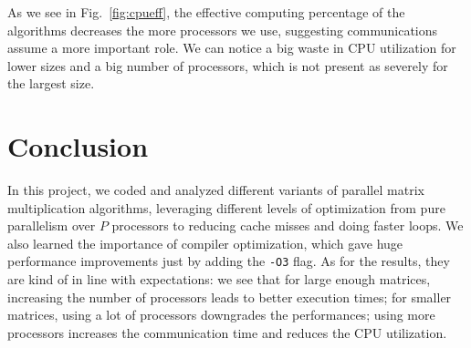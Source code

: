 \documentclass[11pt]{article}
\begin{document}
As we see in Fig.~\ref{fig:cpueff}, the effective computing percentage of the algorithms decreases the more processors we use, suggesting communications assume a more important role. We can notice a big waste in CPU utilization for lower sizes and a big number of processors, which is not present as severely for the largest size.

\section{Conclusion}
In this project, we coded and analyzed different variants of parallel matrix multiplication algorithms, leveraging different levels of optimization from pure parallelism over $P$ processors to reducing cache misses and doing faster loops. We also learned the importance of compiler optimization, which gave huge performance improvements just by adding the \verb|-O3| flag. As for the results, they are kind of in line with expectations: we see that for large enough matrices, increasing the number of processors leads to better execution times; for smaller matrices, using a lot of processors downgrades the performances; using more processors increases the communication time and reduces the CPU utilization.
\end{document}
